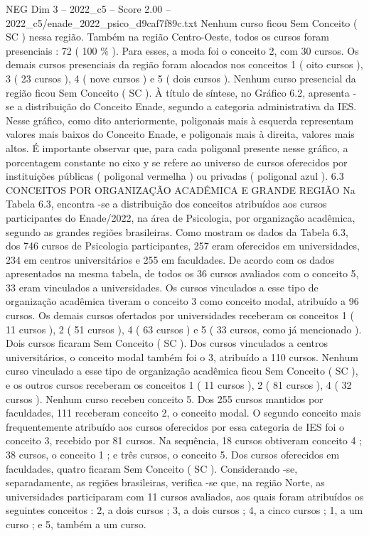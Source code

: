 \begin{textsample}{NEG Dim 3 – 2022\_c5 – Score 2.00 – 2022\_c5/enade\_2022\_psico\_d9caf7f89c.txt}
Nenhum curso ficou Sem Conceito ( SC ) nessa região.
Também na região Centro-Oeste, todos os cursos foram presenciais : 72 ( 100 \% ).
Para esses, a moda foi o conceito 2, com 30 cursos.
Os demais cursos presenciais da região foram alocados nos conceitos 1 ( oito cursos ), 3 ( 23 cursos ), 4 ( nove cursos ) e 5 ( dois cursos ).
Nenhum curso presencial da região ficou Sem Conceito ( SC ).
À título de síntese, no Gráfico 6.2, apresenta -se a distribuição do Conceito Enade, segundo a categoria administrativa da IES.
Nesse gráfico, como dito anteriormente, poligonais mais à esquerda representam valores mais baixos do Conceito Enade, e poligonais mais à direita, valores mais altos.
É importante observar que, para cada poligonal presente nesse gráfico, a porcentagem constante no eixo y se refere ao universo de cursos oferecidos por instituições públicas ( poligonal vermelha ) ou privadas ( poligonal azul ). 6.3 CONCEITOS POR ORGANIZAÇÃO ACADÊMICA E GRANDE REGIÃO Na Tabela 6.3, encontra -se a distribuição dos conceitos atribuídos aos cursos participantes do Enade/2022, na área de Psicologia, por organização acadêmica, segundo as grandes regiões brasileiras.
Como mostram os dados da Tabela 6.3, dos 746 cursos de Psicologia participantes, 257 eram oferecidos em universidades, 234 em centros universitários e 255 em faculdades.
De acordo com os dados apresentados na mesma tabela, de todos os 36 cursos avaliados com o conceito 5, 33 eram vinculados a universidades.
Os cursos vinculados a esse tipo de organização acadêmica tiveram o conceito 3 como conceito modal, atribuído a 96 cursos.
Os demais cursos ofertados por universidades receberam os conceitos 1 ( 11 cursos ), 2 ( 51 cursos ), 4 ( 63 cursos ) e 5 ( 33 cursos, como já mencionado ).
Dois cursos ficaram Sem Conceito ( SC ).
Dos cursos vinculados a centros universitários, o conceito modal também foi o 3, atribuído a 110 cursos.
Nenhum curso vinculado a esse tipo de organização acadêmica ficou Sem Conceito ( SC ), e os outros cursos receberam os conceitos 1 ( 11 cursos ), 2 ( 81 cursos ), 4 ( 32 cursos ).
Nenhum curso recebeu conceito 5.
Dos 255 cursos mantidos por faculdades, 111 receberam conceito 2, o conceito modal.
O segundo conceito mais frequentemente atribuído aos cursos oferecidos por essa categoria de IES foi o conceito 3, recebido por 81 cursos.
Na sequência, 18 cursos obtiveram conceito 4 ; 38 cursos, o conceito 1 ; e três cursos, o conceito 5.
Dos cursos oferecidos em faculdades, quatro ficaram Sem Conceito ( SC ).
Considerando -se, separadamente, as regiões brasileiras, verifica -se que, na região Norte, as universidades participaram com 11 cursos avaliados, aos quais foram atribuídos os seguintes conceitos : 2, a dois cursos ; 3, a dois cursos ; 4, a cinco cursos ; 1, a um curso ; e 5, também a um curso.

\end{textsample}
